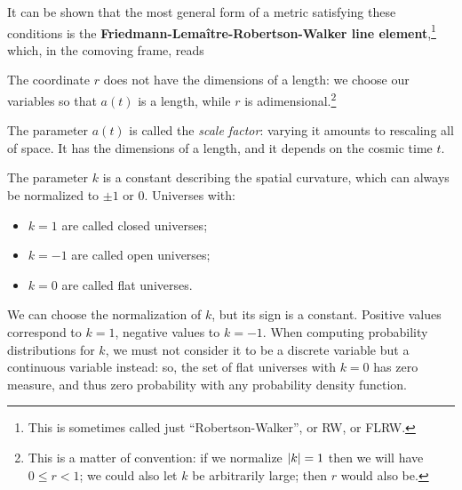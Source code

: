 \documentclass[main.tex]{subfiles}
\begin{document}
It can be shown that the most general form of a metric satisfying these conditions is the \textbf{Friedmann-Lemaître-Robertson-Walker line element},\footnote{This is sometimes called just ``Robertson-Walker'', or RW, or FLRW.} which, in the comoving frame, reads
%
%


The coordinate \(r\) does not have the dimensions of a length: we choose our variables so that \(a(t)\) is a length, while \(r\) is adimensional.\footnote{This is a matter of convention: if we normalize \(\abs{k}=1\) then we will have \(0 \leq r < 1\); we could also let \(k\) be arbitrarily large; then \(r\) would also be.}

The parameter \(a(t)\) is called the \emph{scale factor}: varying it amounts to rescaling all of space.
It has the dimensions of a length, and it depends on the cosmic time \(t\).

The parameter \(k\) is a constant describing the spatial curvature, which can always be normalized to \(\pm 1\) or \(0\).
Universes with:
\begin{itemize}
    \item \(k=1\) are called closed universes;
    \item \(k=-1\) are called open universes;
    \item \(k=0\) are called flat universes.
\end{itemize}

We can choose the normalization of \(k\), but its sign is a constant.
Positive values correspond to \(k=1\), negative values to \(k=-1\).
When computing probability distributions for \(k\), we must not consider it to be a discrete variable but a continuous variable instead: so, the set of flat universes with \(k=0\) has zero measure, and thus zero probability with any probability density function.


\end{document}
